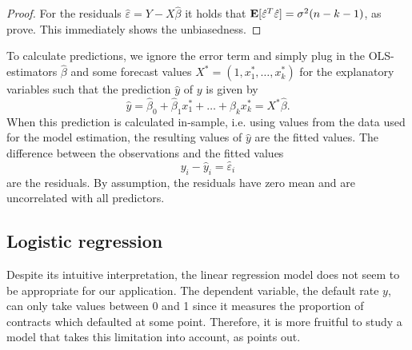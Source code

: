 \documentclass[a4paper, 11pt]{scrreprt}
\newcommand{\ew}{\mbox{\textbf{E}}}
\begin{document}
\begin{proof}
For the residuals $\hat{\varepsilon} = Y - X\hat{\beta}$ it holds that $\ew[\hat{\varepsilon}^T \hat{\varepsilon}] = \sigma^2 (n-k-1)$, as \textcite[eq. (2.1.12)]{judgei1985econometrics} prove. This immediately shows the unbiasedness.
\end{proof}

To calculate predictions, we ignore the error term and simply plug in the OLS-estimators $\hat{\beta}$ and some forecast values $X^* = (1, x_1^*, \ldots, x_k^*)$ for the explanatory variables such that the prediction $\hat{y}$ of $y$ is given by
\begin{equation}
\hat{y} = \hat{\beta}_0 + \hat{\beta}_1 x_1^* + \ldots + \hat{\beta}_k x_k^* = X^* \hat{\beta}.
\end{equation}
When this prediction is calculated in-sample, i.e. using values from the data used for the model estimation, the resulting values of $\hat{y}$ are the fitted values. The difference between the observations and the fitted values 
\begin{equation}
y_i - \hat{y}_i = \hat{\varepsilon}_i
\end{equation}
are the residuals. By assumption, the residuals have zero mean and are uncorrelated with all predictors.


\subsection{Logistic regression}\label{par:logisticregression}

Despite its intuitive interpretation, the linear regression model does not seem to be appropriate for our application. The dependent variable, the default rate $y$, can only take values between 0 and 1 since it measures the proportion of contracts which defaulted at some point. Therefore, it is more fruitful to study a model that takes this limitation into account, as \textcite[chapter 4]{agresti1996introduction} points out.
\end{document}
